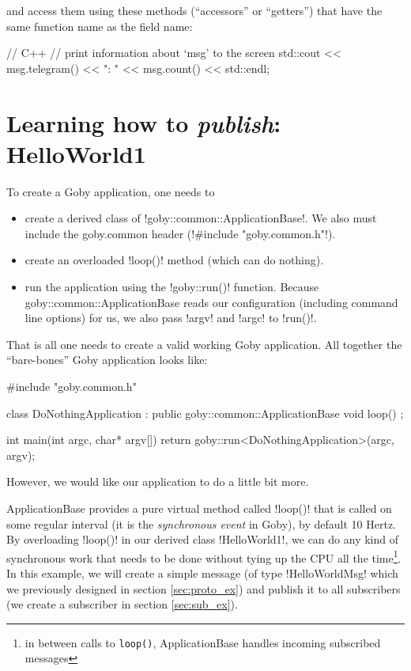 and access them using these methods (``accessors'' or ``getters'') that have the same function name as the field name:

\begin{boxedverbatim}
// C++ 
// print information about `msg' to the screen
std::cout << msg.telegram() << ": " << msg.count() << std::endl;
\end{boxedverbatim}
\resetbvlinenumber


\section{Learning how to \textit{publish}: HelloWorld1}

To create a Goby application, one needs to

\begin{itemize}
\item create a derived class of !goby::common::ApplicationBase!. We also must include the goby.common header (!#include "goby.common.h"!).
\item create an overloaded !loop()! method (which can do nothing).
\item run the application using the !goby::run()! function. Because goby::common::ApplicationBase reads our configuration (including command line options) for us, we also pass !argv! and !argc! to !run()!.
\end{itemize}

That is all one needs to create a valid working Goby application. All together the ``bare-bones'' Goby application looks like:

\begin{boxedverbatim}
#include "goby.common.h"

class DoNothingApplication : public goby::common::ApplicationBase 
{
  void loop() {}
};

int main(int argc, char* argv[])
{   
    return goby::run<DoNothingApplication>(argc, argv);
}
\end{boxedverbatim}
\resetbvlinenumber

However, we would like our application to do a little bit more.

ApplicationBase provides a pure \gls{virtual} method called !loop()! that is called on some regular interval (it is the \textit{\gls{synchronous} event} in Goby), by default 10 Hertz. By overloading !loop()! in our derived class !HelloWorld1!, we can do any kind of synchronous work that needs to be done without tying up the CPU all the time\footnote{in between calls to \texttt{loop()}, ApplicationBase handles incoming subscribed messages}. In this example, we will create a simple message (of type !HelloWorldMsg! which we previously designed in section \ref{sec:proto_ex}) and publish it to all subscribers (we create a subscriber in section \ref{sec:sub_ex}). 

